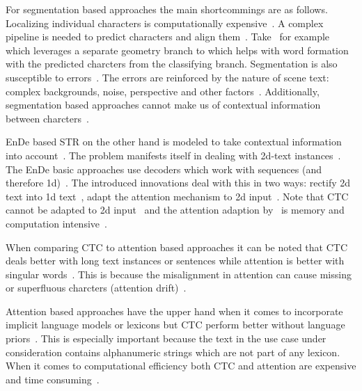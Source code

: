 For segmentation based approaches the main shortcommings are as follows.
Localizing individual characters is computationally expensive~\citep{zhan_esir_2019}.
A complex pipeline is needed to predict characters and align them~\citep{liu_abcnet_2020}.
Take~\cite{wan_textscanner_2020} for example which leverages a separate geometry branch
to which helps with word formation with the predicted charcters from the classifying branch.
Segmentation is also susceptible to errors~\citep{zhan_esir_2019,cheng_aon_2018,chen_text_2021}.
The errors are reinforced by the nature of scene text: complex backgrounds, noise, perspective
and other factors~\citep{hu_gtc_2020,chen_text_2021,baek_what_2019}.
Additionally, segmentation based approaches cannot make us of contextual information between
charcters~\citep{chen_text_2021}.

\ac{EnDe} based \ac{STR} on the other hand is modeled to take contextual information into
account~\citep{long_scene_2021,chen_text_2021}.
The problem manifests itself in dealing with 2d-text
instances~\citep{long_scene_2021,liao_scene_2018}.
The \ac{EnDe} basic approaches use decoders which work with sequences (and therefore
1d)~\citep{long_scene_2021,cheng_aon_2018}.
The introduced innovations deal with this in two ways: rectify 2d text into 1d
text~\citep{zhan_esir_2019,luo_multi-object_2019,shi_aster_2019,liu_char-net_2018}, adapt the
attention mechanism to 2d input~\citep{li_show_2019}.
Note that \ac{CTC} cannot be adapted to 2d input~\citep{cheng_focusing_2017,xie_aggregation_2019}
and the attention adaption by~\cite{li_show_2019} is memory and computation
intensive~\citep{xie_aggregation_2019}.

When comparing \ac{CTC} to attention based approaches it can be noted that \ac{CTC} deals better
with long text instances or sentences while attention is better with singular
words~\citep{cong_comparative_2019,chen_text_2021}.
This is because the misalignment in attention can cause missing or superfluous charcters (attention
drift)~\citep{bai_edit_2018,liao_scene_2018,cheng_focusing_2017}.

Attention based approaches have the upper hand when it comes to incorporate implicit language models
or lexicons but \ac{CTC} perform better without language priors~\citep{cong_comparative_2019}.
This is especially important because the text in the use case under consideration contains
alphanumeric strings which are not part of any lexicon.
When it comes to computational efficiency both \ac{CTC} and attention are expensive and time
consuming~\citep{chen_text_2021}.

